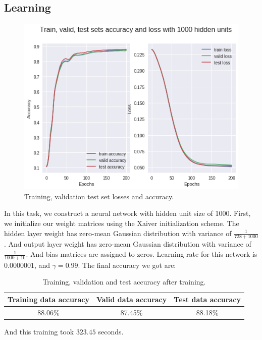 \documentclass[10pt,letterpaper]{article}
\begin{document}
\subsection{Learning}

\begin{figure}[H]
\centering
  \includegraphics[width=.5\linewidth]{img/p1_3.png}
  \caption{Training, validation test set losses and accuracy.}
\end{figure}

In this task, we construct a neural network with hidden unit size of 1000. First, we initialize our weight matrices using the Xaiver initialization scheme. The hidden layer weight has zero-mean Gaussian distribution with variance of $\frac{1}{728+1000}$. And output layer weight has zero-mean Gaussian distribution with variance of $\frac{1}{1000+10}$. And bias matrices are assigned to zeros. Learning rate for this network is $0.0000001$, and $\gamma = 0.99$. The final accuracy we got are: 

\begin{table}[H]
\centering
{\small
\begin{tabular}{ccc}
\hline
 Training data accuracy  & Valid data accuracy      & Test data accuracy \\ \hline
88.06\% & 87.45\% & 88.18\% \\ \hline
\end{tabular}

}

\vspace{-0.2cm}
\caption{Training, validation and test accuracy after training.}
\label{tab:Learning}
\vspace{-0.4cm}

\end{table}

And this training took $323.45$ seconds. \\


\end{document}
